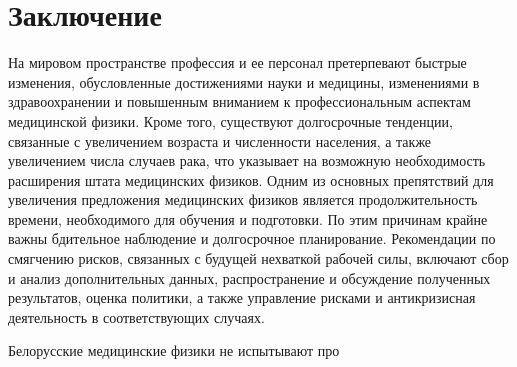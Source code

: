 \documentclass[a4paper,10pt]{extarticle}
\begin{document}
\section{Заключение}

На мировом пространстве профессия и ее персонал претерпевают быстрые изменения, обусловленные достижениями науки и медицины, изменениями в здравоохранении и повышенным вниманием к профессиональным аспектам медицинской физики. Кроме того, существуют долгосрочные тенденции, связанные с увеличением возраста и численности населения, а также увеличением числа случаев рака, что указывает на возможную необходимость расширения штата медицинских физиков. Одним из основных препятствий для увеличения предложения медицинских физиков является продолжительность времени, необходимого для обучения и подготовки. По этим причинам крайне важны бдительное наблюдение и долгосрочное планирование. Рекомендации по смягчению рисков, связанных с будущей нехваткой рабочей силы, включают сбор и анализ дополнительных данных, распространение и обсуждение полученных результатов, оценка политики, а также управление рисками и антикризисная деятельность в соответствующих случаях.

Белорусские медицинские физики не испытывают про


\end{document}
